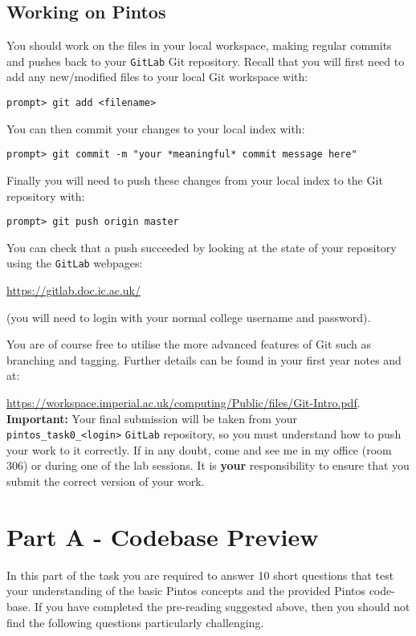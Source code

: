 \documentclass[a4paper,12pt]{article}
\newcommand{\shell}[1]{\lstinline!#1!}
\begin{document}
\subsection*{Working on Pintos}
You should work on the files in your local workspace, making regular commits and pushes back to your \shell{GitLab} Git repository.
Recall that you will first need to add any new/modified files to your local Git workspace with:
%
\begin{lstlisting}[style=shell]
  prompt> git add <filename>
\end{lstlisting}
%
You can then commit your changes to your local index with:
%
\begin{lstlisting}[style=shell]
  prompt> git commit -m "your *meaningful* commit message here"
\end{lstlisting}
%
Finally you will need to push these changes from your local index to the Git repository with:
%
\begin{lstlisting}[style=shell]
  prompt> git push origin master
\end{lstlisting}
%
You can check that a push succeeded by looking at the state of your repository using the \shell{GitLab} webpages: 

\url{https://gitlab.doc.ic.ac.uk/}

\noindent (you will need to login with your normal college username and password).

You are of course free to utilise the more advanced features of Git such as branching and tagging.
Further details can be found in your first year notes and at:

\url{https://workspace.imperial.ac.uk/computing/Public/files/Git-Intro.pdf}.\\

{\bf Important:} Your final submission will be taken from your \shell{pintos_task0_<login>} \shell{GitLab} repository, 
so you must understand how to push your work to it correctly. 
If in any doubt, come and see me in my office (room 306) or during one of the lab sessions.
It is {\bf your} responsibility to ensure that you submit the correct version of your work.


\section*{Part A - Codebase Preview}
In this part of the task you are required to answer 10 short questions that test your understanding of the basic Pintos concepts 
and the provided Pintos code-base.
If you have completed the pre-reading suggested above, then you should not find the following questions particularly challenging.
\end{document}
